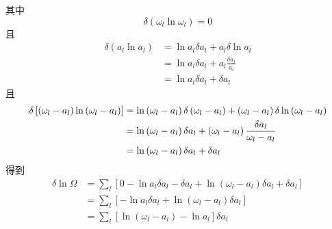 其中
\begin{equation}
    \delta \left( \omega _l\ln \omega _l \right) =0
\end{equation}
且
\begin{equation}
    \begin{aligned}
        \delta \left( a_l\ln a_l \right) &=\ln a_l\delta a_l+a_l\delta \ln a_l
\\
&=\ln a_l\delta a_l+a_l\frac{\delta a_l}{a_l}
\\
&=\ln a_l\delta a_l+\delta a_l
    \end{aligned}
\end{equation}
且
\begin{equation}
    \begin{aligned}
        \delta \left[ \left( \omega _l-a_l \right) \ln \left( \omega _l-a_l \right) \right] &=\ln \left( \omega _l-a_l \right) \delta \left( \omega _l-a_l \right) +\left( \omega _l-a_l \right) \delta \ln \left( \omega _l-a_l \right) 
\\
&=\ln \left( \omega _l-a_l \right) \delta a_l+\left( \omega _l-a_l \right) \small{\frac{\delta a_l}{\omega _l-a_l}}
\\
&=\ln \left( \omega _l-a_l \right) \delta a_l+\delta a_l
    \end{aligned}
\end{equation}
得到
\begin{equation}
    \begin{aligned}
        \delta \ln \Omega &=\sum_l{\left[ 0-\ln a_l\delta a_l-\delta a_l+\ln \left( \omega _l-a_l \right) \delta a_l+\delta a_l \right]}
\\
&=\sum_l{\left[ -\ln a_l\delta a_l+\ln \left( \omega _l-a_l \right) \delta a_l \right]}
\\
&=\sum_l{\left[ \ln \left( \omega _l-a_l \right) -\ln a_l \right] \delta a_l}
    \end{aligned}
\end{equation}

